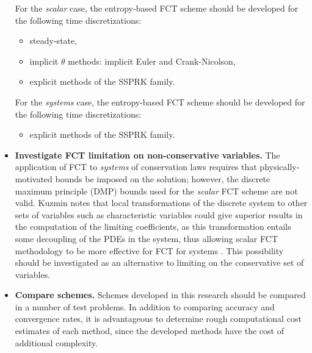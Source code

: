 \begin{itemize}
    For the \emph{scalar} case, the entropy-based FCT scheme should be
    developed for the following time discretizations:
    \begin{itemize}
      \item steady-state,
      \item implicit $\theta$ methods: implicit Euler and Crank-Nicolson,
      \item explicit methods of the SSPRK family.
    \end{itemize}
    For the \emph{systems} case, the entropy-based FCT scheme should be
    developed for the following time discretizations:
    \begin{itemize}
      \item explicit methods of the SSPRK family.
    \end{itemize}
  \item \textbf{Investigate FCT limitation on non-conservative variables.}
    The application of FCT to \emph{systems} of conservation laws requires that
    physically-motivated bounds be imposed on the solution; however, the
    discrete maximum principle (DMP) bounds used for the \emph{scalar}
    FCT scheme are not valid. Kuzmin notes that local
    transformations of the discrete system to other sets of variables such
    as characteristic variables could give superior results in the computation
    of the limiting coefficients, as this transformation entails some
    decoupling of the PDEs in the system, thus allowing scalar FCT methodology
    to be more effective for FCT for systems \cite{kuzmin_FCT}. This
    possibility should be investigated as an alternative to limiting on the
    conservative set of variables.
  \item \textbf{Compare schemes.}
    Schemes developed in this research should be compared in a number of
    test problems. In addition to comparing accuracy and convergence rates,
    it is advantageous to determine rough computational cost estimates
    of each method, since the developed methods have the cost of additional
    complexity.
\end{itemize}


